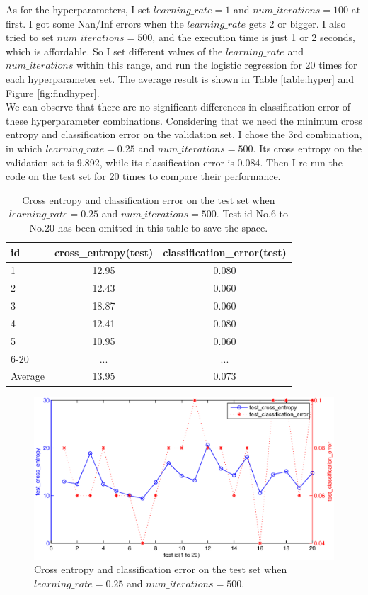 \documentclass{article}
\begin{document}
As for the hyperparameters, I set $learning\_rate=1$ and $num\_iterations=100$ at first. I got some Nan/Inf errors when the $learning\_rate$ gets 2 or bigger. I also tried to set $num\_iterations=500$, and the execution time is just 1 or 2 seconds, which is affordable. So I set different values of the $learning\_rate$ and $num\_iterations$ within this range, and run the logistic regression for 20 times for each hyperparameter set. The average result is shown in Table \ref{table:hyper} and Figure \ref{fig:findhyper}.\\

We can observe that there are no significant differences in classification error of these hyperparameter combinations. Considering that we need the minimum cross entropy and classification error on the validation set, I chose the 3rd combination, in which $learning\_rate=0.25$ and $num\_iterations=500$. Its cross entropy on the validation set is 9.892, while its classification error is 0.084. Then I re-run the code on the test set for 20 times to compare their performance.\\

\begin{table}[htbp]
\centering
\begin{tabular}{lcc}
\toprule
id & cross\_entropy(test) & classification\_error(test) \\
\midrule
1   & 12.95 & 0.080\\
2   & 12.43 & 0.060\\
3   & 18.87 & 0.060\\
4   & 12.41 & 0.080\\
5   & 10.95 & 0.060\\
6-20& ...   & ... \\
\midrule
Average & 13.95 & 0.073\\
\bottomrule
\end{tabular}
\caption{Cross entropy and classification error on the test set when $learning\_rate=0.25$ and $num\_iterations=500$. Test id No.6 to No.20 has been omitted in this table to save the space. 
\label{table:hyper-final}}
\end{table} 

\begin{figure}[htb]
\centering
\includegraphics[width=\textwidth]{logistic-test.eps}
\caption{Cross entropy and classification error on the test set when $learning\_rate=0.25$ and $num\_iterations=500$.
\label{fig:logistic-test}}
\end{figure}
\end{document}
